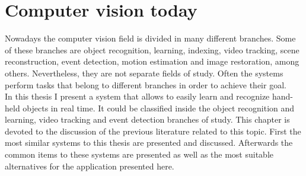 \section{Computer vision today}

Nowadays the computer vision field is divided in many different branches. 
Some of these branches are object recognition, learning, indexing, video tracking, scene reconstruction, event detection, motion estimation and image restoration, among others. 
Nevertheless, they are not separate fields of study. 
Often the systems perform tasks that belong to different branches in order to achieve their goal. 
\\

In this thesis I present a system that allows to easily learn and recognize hand-held objects in real time. 
It could be classified inside the object recognition and learning, video tracking and event detection branches of study. 
This chapter is devoted to the discussion of the previous literature related to this topic. 
First the most similar systems to this thesis are presented and discussed. 
Afterwards the common items to these systems are presented as well as the most suitable alternatives for the application presented here. 


